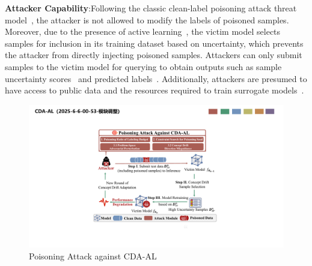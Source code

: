 \documentclass[lettersize,journal]{IEEEtran}
\newcommand{\pandora}{{\scshape Pandora}\xspace}
\begin{document}
\textbf{Attacker Capability}:Following the classic clean-label poisoning attack threat model~\cite{2018-NIPS-Poison-frogs}, the attacker is not allowed to modify the labels of poisoned samples.
Moreover, due to the presence of active learning~\cite{settles2009active}, the victim model selects samples for inclusion in its training dataset based on uncertainty, which prevents the attacker from directly injecting poisoned samples.
Attackers can only submit samples to the victim model for querying to obtain outputs such as sample uncertainty scores~\cite{2025-Baidu-Image-Recognition} and predicted labels~\cite{Virustotaluploadinterface}.
Additionally, attackers are presumed to have access to public data and the resources required to train surrogate models~\cite{2023-AAAI-surrogate-model-for-adversarial-attack}.

\begin{figure}[t]
	\centering
	\includegraphics[width=\linewidth,keepaspectratio]{Graph/Attack_Method/PACDA_attack_process_2025_6_6_01_07.pdf}
	\caption{Poisoning Attack against CDA-AL}
	\label{fig:Attack Process}
\end{figure}
\end{document}
